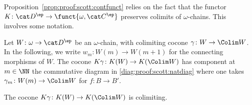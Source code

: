 Proposition~\ref{prop:proof:scott:contfunct}
relies on the fact that the functor
$K \colon \cat D^\ep \to \funct{\omega,\cat C^\ep}$
preserves colimits of $\omega$-chains.
This involves some notation.

Let $W \colon \omega \to \cat D^\ep$ be an $\omega$-chain,
with colimiting cocone $\gamma \colon W \to \Colim W$.
In the following, we write $w_m \colon W(m) \to W(m+1)$
for the connecting morphisms of $W$.
The cocone $K \gamma \colon K(W) \to K(\Colim W)$
has component at $m \in \NN$
the commutative diagram in \eqref{diag:proof:scott:natdiag}
where one takes $\gamma_m \colon W(m) \to \Colim W$
for $f \colon B \to B'$.


\begin{lemma}
\label{lem:proof:scott:colimiting}
The cocone $K\gamma \colon K(W) \to K(\Colim W)$
is colimiting.
\end{lemma}

